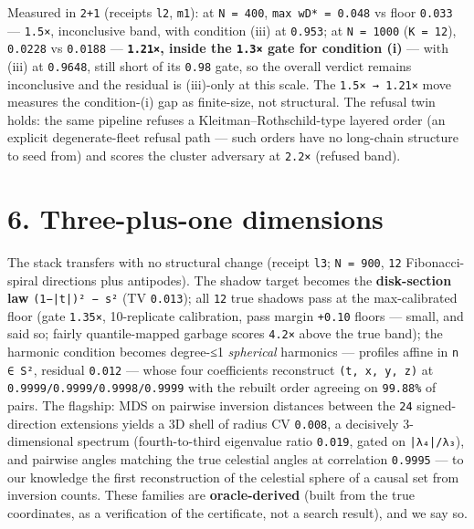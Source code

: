 \documentclass[11pt]{article}
\begin{document}
Measured in \texttt{2+1} (receipts \texttt{l2}, \texttt{m1}): at \texttt{N = 400}, \texttt{max wD* = 0.048} vs floor \texttt{0.033} — \texttt{1.5×}, inconclusive band, with condition (iii) at \texttt{0.953}; at \texttt{N = 1000} (\texttt{K = 12}), \texttt{0.0228} vs \texttt{0.0188} — \textbf{\texttt{1.21×}, inside the \texttt{1.3×} gate for condition (i)} — with (iii) at \texttt{0.9648}, still short of its \texttt{0.98} gate, so the overall verdict remains inconclusive and the residual is (iii)-only at this scale. The \texttt{1.5× → 1.21×} move measures the condition-(i) gap as finite-size, not structural. The refusal twin holds: the same pipeline refuses a Kleitman–Rothschild-type layered order (an explicit degenerate-fleet refusal path — such orders have no long-chain structure to seed from) and scores the cluster adversary at \texttt{2.2×} (refused band).

\section*{6. Three-plus-one dimensions}
The stack transfers with no structural change (receipt \texttt{l3}; \texttt{N = 900}, \texttt{12} Fibonacci-spiral directions plus antipodes). The shadow target becomes the \textbf{disk-section law} \texttt{(1−|t|)² − s²} (TV \texttt{0.013}); all \texttt{12} true shadows pass at the max-calibrated floor (gate \texttt{1.35×}, 10-replicate calibration, pass margin \texttt{+0.10} floors — small, and said so; fairly quantile-mapped garbage scores \texttt{4.2×} above the true band); the harmonic condition becomes degree-≤1 \emph{spherical} harmonics — profiles affine in \texttt{n ∈ S²}, residual \texttt{0.012} — whose four coefficients reconstruct \texttt{(t, x, y, z)} at \texttt{0.9999/0.9999/0.9998/0.9999} with the rebuilt order agreeing on \texttt{99.88\%} of pairs. The flagship: MDS on pairwise inversion distances between the \texttt{24} signed-direction extensions yields a 3D shell of radius CV \texttt{0.008}, a decisively 3-dimensional spectrum (fourth-to-third eigenvalue ratio \texttt{0.019}, gated on \texttt{|λ₄|/λ₃}), and pairwise angles matching the true celestial angles at correlation \texttt{0.9995} — to our knowledge the first reconstruction of the celestial sphere of a causal set from inversion counts. These families are \textbf{oracle-derived} (built from the true coordinates, as a verification of the certificate, not a search result), and we say so.
\end{document}
